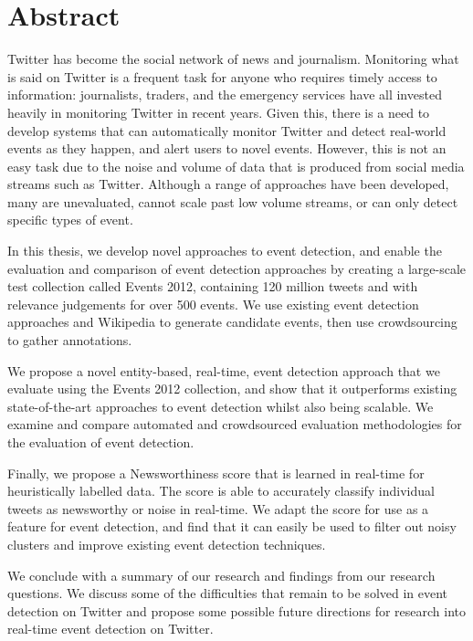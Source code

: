 
\chapter*{Abstract}
\thispagestyle{empty}
\vspace{-1cm}

Twitter has become the social network of news and journalism. Monitoring what is said on Twitter is a frequent task for anyone who requires timely access to information: journalists, traders, and the emergency services have all invested heavily in monitoring Twitter in recent years.
Given this, there is a need to develop systems that can automatically monitor Twitter and detect real-world events as they happen, and alert users to novel events. However, this is not an easy task due to the noise and volume of data that is produced from social media streams such as Twitter. Although a range of approaches have been developed, many are unevaluated, cannot scale past low volume streams, or can only detect specific types of event.

In this thesis, we develop novel approaches to event detection, and enable the evaluation and comparison of event detection approaches by creating a large-scale test collection called Events 2012, containing 120 million tweets and with relevance judgements for over 500 events. We use existing event detection approaches and Wikipedia to generate candidate events, then use crowdsourcing to gather annotations.

We propose a novel entity-based, real-time, event detection approach that we evaluate using the Events 2012 collection, and show that it outperforms existing state-of-the-art approaches to event detection whilst also being scalable.
We examine and compare automated and crowdsourced evaluation methodologies for the evaluation of event detection.

Finally, we propose a Newsworthiness score that is learned in real-time for heuristically labelled data. The score is able to accurately classify individual tweets as newsworthy or noise in real-time. We adapt the score for use as a feature for event detection, and find that it can easily be used to filter out noisy clusters and improve existing event detection techniques.

We conclude with a summary of our research and findings from our research questions. We discuss some of the difficulties that remain to be solved in event detection on Twitter and propose some possible future directions for research into real-time event detection on Twitter.